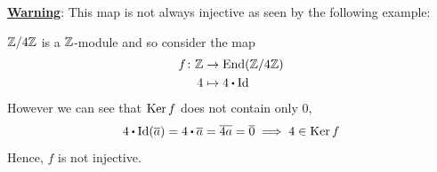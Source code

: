 \documentclass[../Main.tex]{subfiles}
\begin{document}
\textbf{\textcolor{BrickRed}{\underline{Warning}}}: This map is not always injective as seen by the following example:
\begin{example}
	$\mathbb{Z}/4\mathbb{Z}$ is a $\mathbb{Z}$-module and so consider the map
	\begin{align*}
	f\colon \Z&\to \End(\modZ{4}) \\
	4&\mapsto 4\rdot \Id
	\end{align*}
	However we can see that $\operatorname{Ker} f$ does not contain only $0$,
	\[4\rdot \Id(\obar{a}) = 4\rdot \obar{a} = \obar{4a} = \obar{0} \implies 4 \in \Ker f\]
	Hence, $f$ is not injective.
\end{example}
\end{document}
